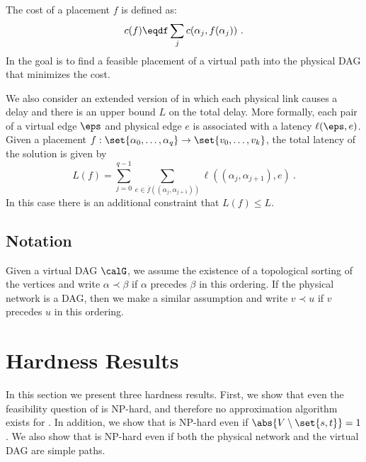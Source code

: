 The cost of a placement $f$ is defined as:
\[
c(f) \eqdf \sum_j c(\alpha_j,f(\alpha_j))
~.
\]
In \scp the goal is to find a feasible placement of a virtual path
into the physical DAG that minimizes the cost.


We also consider an extended version of \scp in which each physical
link causes a delay and there is an upper bound $L$ on the total
delay.  More formally, each pair of a virtual edge $\eps$ and physical
edge $e$ is associated with a latency $\ell(\eps,e)$.
%
Given a placement $f: \set{\alpha_0,\ldots,\alpha_q} \to
\set{v_0,\ldots,v_k}$, the total latency of the solution is given by
\[
L(f)
= \sum_{j=0}^{q-1} \sum_{e \in \bar{f}((\alpha_j,\alpha_{j+1}))} \ell((\alpha_j,\alpha_{j+1}),e)
~.
\]
In this case there is an additional constraint that $L(f) \leq L$.



%

\subsection{Notation}
%
Given a virtual DAG $\calG$, we assume the existence of a topological
sorting of the vertices and write $\alpha \prec \beta$ if $\alpha$
precedes $\beta$ in this ordering.  If the physical network is a DAG,
then we make a similar assumption and write $v \prec u$ if $v$
precedes $u$ in this ordering.



\section{Hardness Results}

In this section we present three hardness results.  First, we show
that even the feasibility question of \scp is NP-hard, and therefore
no approximation algorithm exists for \scp.  In addition, we show that
\scp is NP-hard even if $\abs{V \setminus \set{s,t}} = 1$.  We also
show that \scp is NP-hard even if both the physical network and the
virtual DAG are simple paths.

